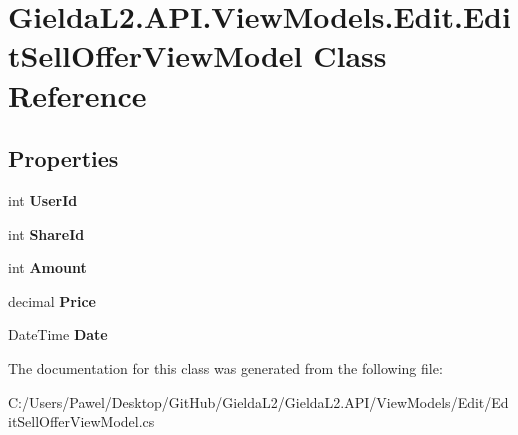 \hypertarget{class_gielda_l2_1_1_a_p_i_1_1_view_models_1_1_edit_1_1_edit_sell_offer_view_model}{}\section{Gielda\+L2.\+A\+P\+I.\+View\+Models.\+Edit.\+Edit\+Sell\+Offer\+View\+Model Class Reference}
\label{class_gielda_l2_1_1_a_p_i_1_1_view_models_1_1_edit_1_1_edit_sell_offer_view_model}
\subsection*{Properties}
\begin{DoxyCompactItemize}
\item 
\mbox{\label{class_gielda_l2_1_1_a_p_i_1_1_view_models_1_1_edit_1_1_edit_sell_offer_view_model_af97c4cb47e70658cb3d6b7b52e28dba8}} 
int {\bfseries User\+Id}
\item 
\mbox{\label{class_gielda_l2_1_1_a_p_i_1_1_view_models_1_1_edit_1_1_edit_sell_offer_view_model_a0c1df35136c9d8690480a554606816f8}} 
int {\bfseries Share\+Id}
\item 
\mbox{\label{class_gielda_l2_1_1_a_p_i_1_1_view_models_1_1_edit_1_1_edit_sell_offer_view_model_a4e5032e8c2cc95ed15a23625c52e1e53}} 
int {\bfseries Amount}
\item 
\mbox{\label{class_gielda_l2_1_1_a_p_i_1_1_view_models_1_1_edit_1_1_edit_sell_offer_view_model_ad0aadac0a469caa9309e5f2edd879cb5}} 
decimal {\bfseries Price}
\item 
\mbox{\label{class_gielda_l2_1_1_a_p_i_1_1_view_models_1_1_edit_1_1_edit_sell_offer_view_model_a7acecaa0a9ecf77ea13b015e58ece112}} 
Date\+Time {\bfseries Date}
\end{DoxyCompactItemize}


The documentation for this class was generated from the following file\+:\begin{DoxyCompactItemize}
\item 
C\+:/\+Users/\+Pawel/\+Desktop/\+Git\+Hub/\+Gielda\+L2/\+Gielda\+L2.\+A\+P\+I/\+View\+Models/\+Edit/Edit\+Sell\+Offer\+View\+Model.\+cs\end{DoxyCompactItemize}
